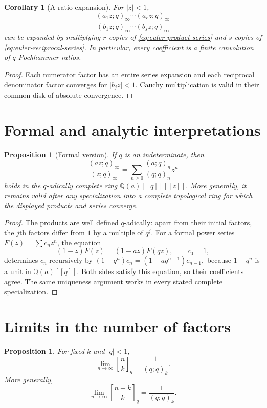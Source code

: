 \documentclass[11pt,oneside,openany]{book}
\newtheorem{proposition}[theorem]{Proposition}
\newtheorem{corollary}[theorem]{Corollary}
\theoremstyle{definition}
\theoremstyle{remark}
\newcommand{\qbinom}[2]{\genfrac{[}{]}{0pt}{}{#1}{#2}_{q}}
\newcommand{\Q}{\mathbb Q}
\newcommand{\abs}[1]{\lvert #1\rvert}
\begin{document}
\begin{corollary}[A ratio expansion]\label{cor:ratio-expansion}
For $\abs z<1$,
\[
 \frac{(a_1z;q)_\infty\cdots(a_rz;q)_\infty}
 {(b_1z;q)_\infty\cdots(b_sz;q)_\infty}
\]
can be expanded by multiplying $r$ copies of \eqref{eq:euler-product-series} and $s$ copies of \eqref{eq:euler-reciprocal-series}.  In particular, every coefficient is a finite convolution of $q$-Pochhammer ratios.
\end{corollary}

\begin{proof}
Each numerator factor has an entire series expansion and each reciprocal denominator factor converges for $\abs{b_jz}<1$.  Cauchy multiplication is valid in their common disk of absolute convergence.
\end{proof}

\section{Formal and analytic interpretations}

\begin{proposition}[Formal version]\label{prop:formal-qbinomial}
If $q$ is an indeterminate, then
\[
 \frac{(az;q)_\infty}{(z;q)_\infty}
 =\sum_{n\ge0}\frac{(a;q)_n}{(q;q)_n}z^n
\]
holds in the $q$-adically complete ring $\Q(a)[[q]][[z]]$.  More generally, it remains valid after any specialization into a complete topological ring for which the displayed products and series converge.
\end{proposition}

\begin{proof}
The products are well defined $q$-adically: apart from their initial factors, the $j$th factors differ from $1$ by a multiple of $q^j$.  For a formal power series $F(z)=\sum c_nz^n$, the equation
\[
 (1-z)F(z)=(1-az)F(qz),\qquad c_0=1,
\]
determines $c_n$ recursively by
\(
 (1-q^n)c_n=(1-aq^{n-1})c_{n-1},
\)
because $1-q^n$ is a unit in $\Q(a)[[q]]$.  Both sides satisfy this equation, so their coefficients agree.  The same uniqueness argument works in every stated complete specialization.
\end{proof}

\section{Limits in the number of factors}

\begin{proposition}\label{prop:fixed-k-limit}
For fixed $k$ and $\abs q<1$,
\[
 \lim_{n\to\infty}\qbinom nk=\frac1{(q;q)_k}.
\]
More generally,
\[
 \lim_{n\to\infty}\qbinom{n+k}{k}=\frac1{(q;q)_k}.
\]
\end{proposition}
\end{document}
